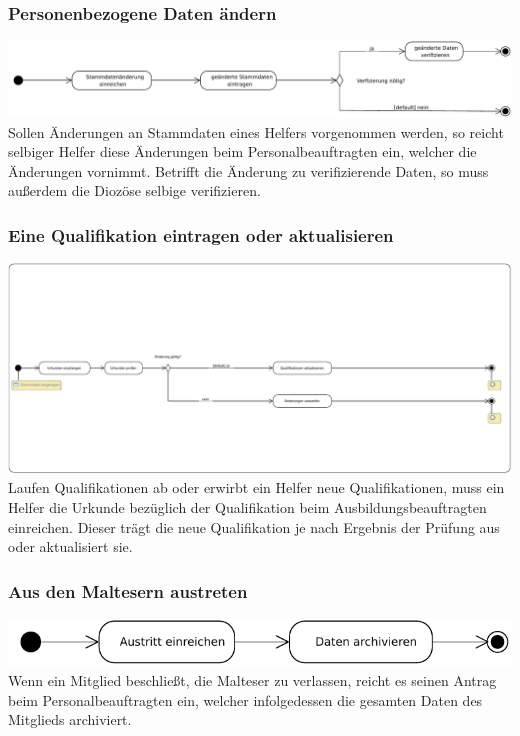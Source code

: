\documentclass{beamer}
\begin{document}
\begin{frame}
\frametitle{Personenbezogene Daten ändern}
\includegraphics[width=\textwidth]{PDF/BusinessP/Daten_aendern.pdf}
\pause
Sollen Änderungen an Stammdaten eines Helfers vorgenommen werden, so reicht selbiger Helfer diese Änderungen beim Personalbeauftragten ein, welcher die Änderungen vornimmt. Betrifft die Änderung zu verifizierende Daten, so muss außerdem die Diozöse selbige verifizieren.
\end{frame}

\begin{frame}
\frametitle{Eine Qualifikation eintragen oder aktualisieren}
\includegraphics[width=\textwidth]{PDF/BusinessP/Qualifikation_eintragen.pdf}
\pause
Laufen Qualifikationen ab oder erwirbt ein Helfer neue Qualifikationen, muss ein Helfer die Urkunde bezüglich der Qualifikation beim Ausbildungsbeauftragten einreichen. Dieser trägt die neue Qualifikation je nach Ergebnis der Prüfung aus oder aktualisiert sie.
\end{frame}

\begin{frame}
\frametitle{Aus den Maltesern austreten}
\includegraphics[width=\textwidth]{PDF/BusinessP/Austreten.pdf}
\pause
Wenn ein Mitglied beschließt, die Malteser zu verlassen, reicht es seinen Antrag beim Personalbeauftragten ein, welcher infolgedessen die gesamten Daten des Mitglieds archiviert.
\end{frame}
\end{document}
